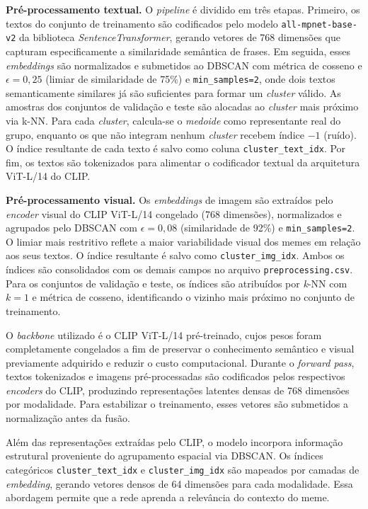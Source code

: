 \textbf{Pré-processamento textual.} O \textit{pipeline} é dividido em três etapas. Primeiro, os textos do conjunto de treinamento são codificados pelo modelo \texttt{all-mpnet-base-v2} da biblioteca \textit{SentenceTransformer}, gerando vetores de 768 dimensões que capturam especificamente a similaridade semântica de frases. Em seguida, esses \textit{embeddings} são normalizados e submetidos ao DBSCAN com métrica de cosseno e $\epsilon = 0{,}25$ (limiar de similaridade de 75\%) e \texttt{min\_samples=2}, onde dois textos semanticamente similares já são suficientes para formar um \textit{cluster} válido. As amostras dos conjuntos de validação e teste são alocadas ao \textit{cluster} mais próximo via k-NN. Para cada \textit{cluster}, calcula-se o \textit{medoide} como representante real do grupo, enquanto os que não integram nenhum \textit{cluster} recebem índice $-1$ (ruído). O índice resultante de cada texto é salvo como coluna \texttt{cluster\_text\_idx}. Por fim, os textos são tokenizados para alimentar o codificador textual da arquitetura ViT-L/14 do CLIP.

\textbf{Pré-processamento visual.} Os \textit{embeddings} de imagem são extraídos pelo \textit{encoder} visual do CLIP ViT-L/14 congelado (768 dimensões), normalizados e agrupados pelo DBSCAN com $\epsilon = 0{,}08$ (similaridade de 92\%) e \texttt{min\_samples=2}. O limiar mais restritivo reflete a maior variabilidade visual dos memes em relação aos seus textos. O índice resultante é salvo como \texttt{cluster\_img\_idx}. Ambos os índices são consolidados com os demais campos no arquivo \texttt{preprocessing.csv}. Para os conjuntos de validação e teste, os índices são atribuídos por \textit{k}-NN com $k{=}1$ e métrica de cosseno, identificando o vizinho mais próximo no conjunto de treinamento.

O \textit{backbone} utilizado é o CLIP ViT-L/14 pré-treinado, cujos pesos foram completamente
congelados a fim de preservar o conhecimento semântico e visual previamente
adquirido e reduzir o custo computacional. Durante o \textit{forward pass}, textos
tokenizados e imagens pré-processadas são codificados pelos respectivos
\textit{encoders} do CLIP, produzindo representações latentes densas de 768
dimensões por modalidade. Para estabilizar o treinamento, esses vetores são
submetidos a normalização antes da fusão.

Além das representações extraídas
pelo CLIP, o modelo incorpora informação estrutural proveniente do agrupamento
espacial via DBSCAN. Os índices categóricos \texttt{cluster\_text\_idx} e
\texttt{cluster\_img\_idx} são mapeados por camadas de \textit{embedding},
gerando vetores densos de 64 dimensões para cada modalidade. Essa abordagem
permite que a rede aprenda a relevância do contexto do meme.


